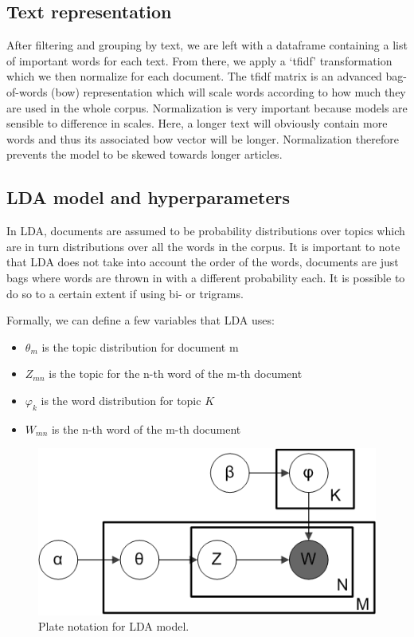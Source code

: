 \documentclass[11pt]{article}
\begin{document}
\subsection{Text representation}
After filtering and grouping by text, we are left with a dataframe containing a list of important words for each text. From there, we apply a `tfidf' transformation which we then normalize for each document. The tfidf matrix is an advanced bag-of-words (bow) representation which will scale words according to how much they are used in the whole corpus. Normalization is very important because models are sensible to difference in scales. Here, a longer text will obviously contain more words and thus its associated bow vector will be longer. Normalization therefore prevents the model to be skewed towards longer articles.

\subsection{LDA model and hyperparameters}
In LDA, documents are assumed to be probability distributions over topics which are in turn distributions over all the words in the corpus. It is important to note that LDA does not take into account the order of the words, documents are just bags where words are thrown in with a different probability each. It is possible to do so to a certain extent if using bi- or trigrams.

Formally, we can define a few variables that LDA uses:
\begin{itemize}
    \item $\theta_{m}$ is the topic distribution for document m
    \item $Z_{mn}$ is the topic for the n-th word of the m-th document
    \item $\varphi_{k}$ is the word distribution for topic $K$
    \item $W_{mn}$ is the n-th word of the m-th document
\end{itemize}

\begin{figure}[htpb!]
    \centering
    \includegraphics[width=.4\textwidth]{images/LDA.png}
    \caption{Plate notation for LDA model.}
    \label{fig:lda}
\end{figure}
\end{document}
